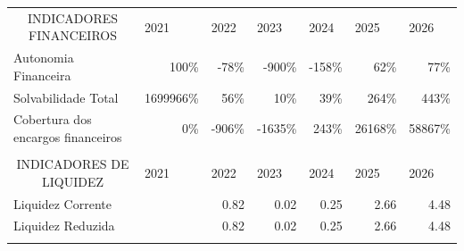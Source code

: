 \documentclass[11pt]{article}
\begin{document}
\begin{adjustbox}{center}
\begin{tabular}{|l|r|r|r|r|r|r|}
			&                           &                           &                           &                           &                           &                           \\ \hline
			\multicolumn{1}{|c|}{INDICADORES FINANCEIROS}              & \multicolumn{1}{l|}{2021} & \multicolumn{1}{l|}{2022} & \multicolumn{1}{l|}{2023} & \multicolumn{1}{l|}{2024} & \multicolumn{1}{l|}{2025} & \multicolumn{1}{l|}{2026} \\ \hline
			Autonomia Financeira                                       & 100\%                     & -78\%                     & -900\%                    & -158\%                    & 62\%                      & 77\%                      \\ \hline
			Solvabilidade Total                                        & 1699966\%                 & 56\%                      & 10\%                      & 39\%                      & 264\%                     & 443\%                     \\ \hline
			Cobertura dos encargos financeiros                         & 0\%                       & -906\%                    & -1635\%                   & 243\%                     & 26168\%                   & 58867\%                   \\ \hline
			&                           &                           &                           &                           &                           &                           \\ \hline
			\multicolumn{1}{|c|}{INDICADORES DE LIQUIDEZ}              & \multicolumn{1}{l|}{2021} & \multicolumn{1}{l|}{2022} & \multicolumn{1}{l|}{2023} & \multicolumn{1}{l|}{2024} & \multicolumn{1}{l|}{2025} & \multicolumn{1}{l|}{2026} \\ \hline
			Liquidez Corrente                                          &                           & 0.82                      & 0.02                      & 0.25                      & 2.66                      & 4.48                      \\ \hline
			Liquidez Reduzida                                          &                           & 0.82                      & 0.02                      & 0.25                      & 2.66                      & 4.48                      \\ \hline
			&                           &                           &                           &                           &                           &                           \\ \hline

\end{tabular}
\end{adjustbox}
\end{document}
